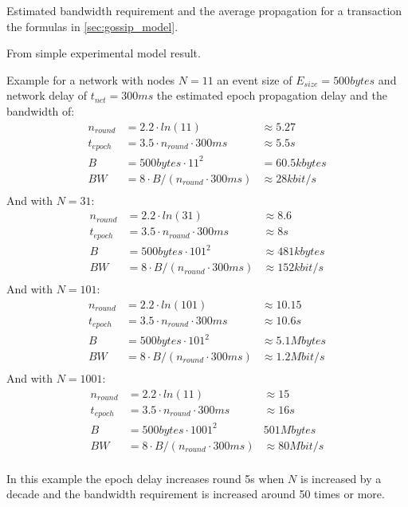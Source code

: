 Estimated bandwidth requirement and the average propagation for a transaction the formulas in \cref{sec:gossip_model}.
 
From simple experimental model result.

Example for a network with nodes $N=11$ an event size of $E_{size}=500bytes$ and network delay of $t_{net}=300ms$ the estimated epoch propagation delay
and the bandwidth of:
\begin{align*}
n_{round} &= 2.2 \cdot ln(11) &\approx  5.27\\
t_{epoch} &= 3.5 \cdot n_{round} \cdot 300ms & \approx 5.5s \\
B &= 500bytes \cdot 11^2 &= 60.5kbytes \\
BW &= 8 \cdot B / (n_{round}\cdot 300ms) &\approx 28kbit/s \\
\end{align*}
And with $N=31$:
\begin{align*}
n_{round} &= 2.2 \cdot ln(31) & \approx  8.6\\
t_{epoch} &= 3.5 \cdot n_{round} \cdot 300ms & \approx 8s \\
B &= 500bytes \cdot 101^2 & \approx 481kbytes \\
BW &= 8 \cdot B / (n_{round}\cdot 300ms) &\approx 152kbit/s \\
\end{align*}
And with $N=101$:
\begin{align*}
n_{round} &= 2.2 \cdot ln(101) & \approx  10.15\\
t_{epoch} &= 3.5 \cdot n_{round} \cdot 300ms & \approx 10.6s \\
B &= 500bytes \cdot 101^2 & \approx 5.1Mbytes \\
BW &= 8 \cdot B / (n_{round}\cdot 300ms) &\approx 1.2Mbit/s \\
\end{align*}
And with $N=1001$:
\begin{align*}
n_{round} &= 2.2 \cdot ln(11) & \approx  15\\
t_{epoch} &= 3.5 \cdot n_{round} \cdot 300ms & \approx 16s \\
B &= 500bytes \cdot 1001^2 & 501Mbytes \\
BW &= 8 \cdot B / (n_{round}\cdot 300ms) &\approx 80Mbit/s \\
\end{align*}

In this example the epoch delay increases round 5s when $N$ is increased by a decade and the bandwidth requirement is increased around 50 times or more.


